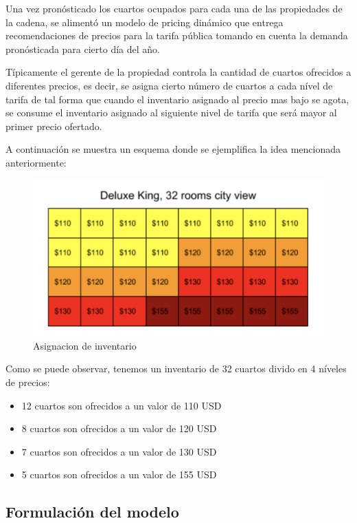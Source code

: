 Una vez pronósticado los cuartos ocupados para cada una de las propiedades de la cadena, se alimentó un modelo de pricing dinámico que entrega recomendaciones de precios para la tarifa pública tomando en cuenta la demanda pronósticada para cierto día del año.

Típicamente el gerente de la propiedad controla la cantidad de cuartos ofrecidos a diferentes precios, es decir, se asigna cierto número de cuartos a cada nível de tarifa de tal forma que cuando el inventario asignado al precio mas bajo se agota, se consume el inventario asignado al siguiente nivel de tarifa que será mayor al primer precio ofertado.

A continuación se muestra un esquema donde se ejemplifica la idea mencionada anteriormente:

\begin{figure}[H]
  \includegraphics[width=\linewidth]{Figures/buckets.png}
  \caption{Asignacion de inventario}
  \label{fig:Asignacion de Inventario}
\end{figure}

Como se puede observar, tenemos un inventario de 32 cuartos divido en 4 níveles de precios:
\begin{itemize}[noitemsep]
\item 12 cuartos son ofrecidos a un valor de 110 USD
\item 8 cuartos son ofrecidos a un valor de 120 USD
\item 7 cuartos son ofrecidos a un valor de 130 USD
\item 5 cuartos son ofrecidos a un valor de 155 USD
\end{itemize}

\subsection*{Formulación del modelo}

